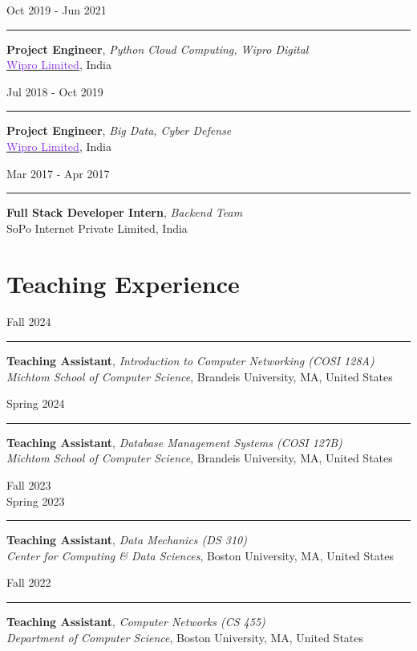 \documentclass[10pt,a4paper,calibri]{moderncv}
\newcommand{\beforesection}{\vspace{-0.5em}}
\newcommand{\mediumspace}{\vspace{0.5em}}
\newcommand{\workexperience}[2]{
  \noindent
  \begin{minipage}[c]{0.20\textwidth}
    \begin{flushright}
      #1      
    \end{flushright}
  \end{minipage}%
  \hspace{0.01\textwidth}
  \begin{minipage}[c]{0.02\textwidth}
    \textcolor{lightgray}{\rule{1pt}{0.7cm}}
  \end{minipage}%
  \begin{minipage}[c]{0.80\textwidth}
    \raggedright{
    #2
    }
  \end{minipage}%
}
\newcommand{\teachingexperience}[2]{
\noindent
  \begin{minipage}[c]{0.12\textwidth}
    \begin{center}
        #1
    \end{center}
  \end{minipage}%
  \hspace{0.01\textwidth}
  \begin{minipage}[c]{0.02\textwidth}
    \textcolor{lightgray}{\rule{1pt}{0.7cm}}
  \end{minipage}%
  \begin{minipage}[c]{0.86\textwidth}
    \raggedright{
      \vspace{0.001cm}
      #2
      \vspace{0.001cm}
    }  
  \end{minipage}%
}
\begin{document}
\mediumspace

\workexperience{Oct 2019 \-- Jun 2021}{
  \textbf{Project Engineer}, \textit{Python Cloud Computing, Wipro Digital}\\
    \href{https://www.wipro.com/}{\textcolor{blueviolet}{Wipro Limited}}, India\\
}

\mediumspace

\workexperience{Jul 2018 \-- Oct 2019}{
  \textbf{Project Engineer}, \textit{Big Data, Cyber Defense}\\
    \href{https://www.wipro.com/}{\textcolor{blueviolet}{Wipro Limited}}, India\\
}

\mediumspace

\workexperience{Mar 2017 \-- Apr 2017}{
  \textbf{Full Stack Developer Intern}, \textit{Backend Team}\\
    SoPo Internet Private Limited, India\\
}

\beforesection

\section{Teaching Experience}
\teachingexperience{\hfill Fall 2024}{
    \textbf{Teaching Assistant}, \textit{Introduction to Computer Networking (COSI 128A)}\\
    \textit{Michtom School of Computer Science}, Brandeis University, MA, United States\\
}

\mediumspace

\teachingexperience{\hfill Spring 2024}{
    \textbf{Teaching Assistant}, \textit{Database Management Systems (COSI 127B)}\\
    \textit{Michtom School of Computer Science}, Brandeis University, MA, United States\\
}

\mediumspace

\teachingexperience{\hfill Fall 2023\\ \hfill Spring 2023}{
    \textbf{Teaching Assistant}, \textit{Data Mechanics (DS 310)}\\
    \textit{Center for Computing \& Data Sciences}, Boston University, MA, United States\\
}

\mediumspace

\teachingexperience{\hfill Fall 2022}{
  \textbf{Teaching Assistant}, \textit{Computer Networks (CS 455)}\\
  \textit{Department of Computer Science}, Boston University, MA, United States\\
}
\end{document}

